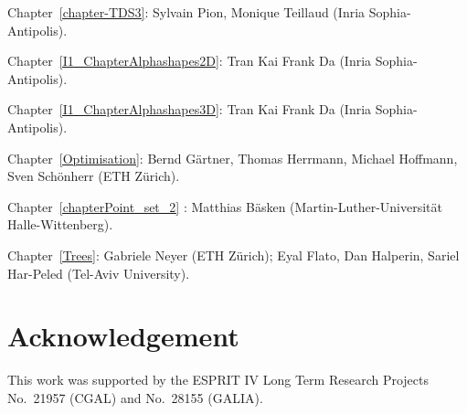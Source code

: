 \noindent
Chapter~\ref{chapter-TDS3}: 
Sylvain Pion, Monique Teillaud ({\sc Inria} Sophia-Antipolis).

\noindent
Chapter~\ref{I1_ChapterAlphashapes2D}: 
Tran Kai Frank Da ({\sc Inria} Sophia-Antipolis).

\noindent
Chapter~\ref{I1_ChapterAlphashapes3D}: 
Tran Kai Frank Da ({\sc Inria} Sophia-Antipolis).

\noindent
Chapter~\ref{Optimisation}: Bernd G\"artner, Thomas Herrmann, Michael Hoffmann,
Sven Sch\"onherr (ETH Z\"urich).

\noindent
Chapter~\ref{chapterPoint_set_2} : Matthias B\"asken (Martin-Luther-Universit{\"a}t Halle-Wittenberg).

\noindent
Chapter~\ref{Trees}: Gabriele Neyer (ETH Z\"urich);
Eyal Flato, Dan Halperin, Sariel Har-Peled (Tel-Aviv University).


\section*{Acknowledgement}


This work was supported
by the ESPRIT IV Long Term Research Projects No.~21957 (CGAL)
and No.~28155 (GALIA).


